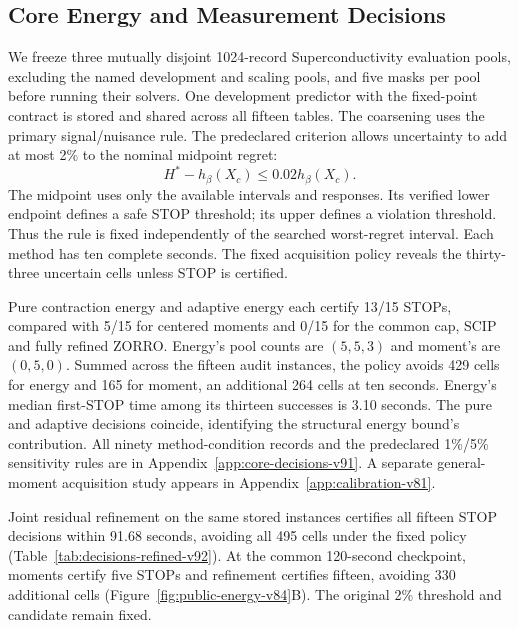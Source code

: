 \subsection{Core Energy and Measurement Decisions}\label{sec:core-decisions-v91}
We freeze three mutually disjoint 1024-record Superconductivity evaluation pools, excluding the named development and scaling pools, and five masks per pool before running their solvers. One development predictor with the fixed-point contract is stored and shared across all fifteen tables. The coarsening uses the primary signal/nuisance rule. The predeclared criterion allows uncertainty to add at most 2\% to the nominal midpoint regret:
\begin{equation}
 H^*-h_\beta(X_c)\le0.02h_\beta(X_c).\label{eq:core-decision-v91}
\end{equation}
The midpoint uses only the available intervals and responses. Its verified lower endpoint defines a safe STOP threshold; its upper defines a violation threshold. Thus the rule is fixed independently of the searched worst-regret interval. Each method has ten complete seconds. The fixed acquisition policy reveals the thirty-three uncertain cells unless STOP is certified.

Pure contraction energy and adaptive energy each certify 13/15 STOPs, compared with 5/15 for centered moments and 0/15 for the common cap, SCIP and fully refined ZORRO. Energy's pool counts are $(5,5,3)$ and moment's are $(0,5,0)$. Summed across the fifteen audit instances, the policy avoids 429 cells for energy and 165 for moment, an additional 264 cells at ten seconds. Energy's median first-STOP time among its thirteen successes is 3.10 seconds. The pure and adaptive decisions coincide, identifying the structural energy bound's contribution. All ninety method-condition records and the predeclared 1\%/5\% sensitivity rules are in Appendix~\ref{app:core-decisions-v91}. A separate general-moment acquisition study appears in Appendix~\ref{app:calibration-v81}.

Joint residual refinement on the same stored instances certifies all fifteen STOP decisions within 91.68 seconds, avoiding all 495 cells under the fixed policy (Table~\ref{tab:decisions-refined-v92}). At the common 120-second checkpoint, moments certify five STOPs and refinement certifies fifteen, avoiding 330 additional cells (Figure~\ref{fig:public-energy-v84}B). The original 2\% threshold and candidate remain fixed.
